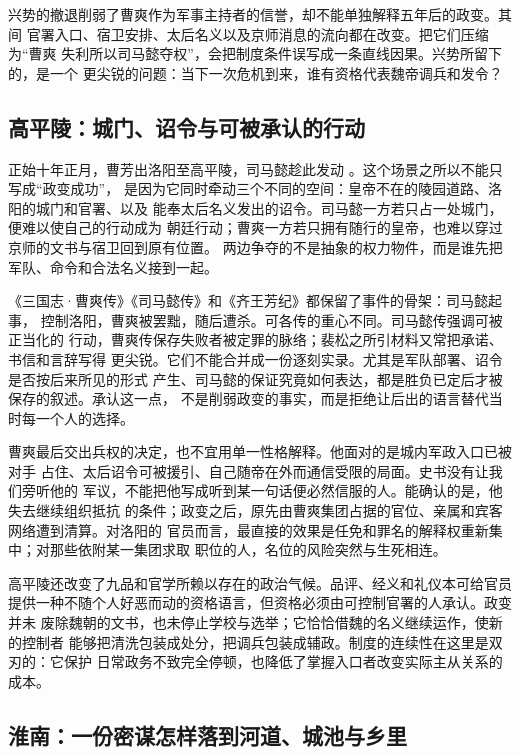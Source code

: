 \begin{turningpoint}
兴势的撤退削弱了曹爽作为军事主持者的信誉，却不能单独解释五年后的政变。其间
官署入口、宿卫安排、太后名义以及京师消息的流向都在改变。把它们压缩为“曹爽
失利所以司马懿夺权”，会把制度条件误写成一条直线因果。兴势所留下的，是一个
更尖锐的问题：当下一次危机到来，谁有资格代表魏帝调兵和发令？
\end{turningpoint}

\subsection{高平陵：城门、诏令与可被承认的行动}

正始十年正月，曹芳出洛阳至高平陵，司马懿趁此发动
。这个场景之所以不能只写成“政变成功”，
是因为它同时牵动三个不同的空间：皇帝不在的陵园道路、洛阳的城门和官署、以及
能奉太后名义发出的诏令。司马懿一方若只占一处城门，便难以使自己的行动成为
朝廷行动；曹爽一方若只拥有随行的皇帝，也难以穿过京师的文书与宿卫回到原有位置。
两边争夺的不是抽象的权力物件，而是谁先把军队、命令和合法名义接到一起。

《三国志·曹爽传》《司马懿传》和《齐王芳纪》都保留了事件的骨架：司马懿起事，
控制洛阳，曹爽被罢黜，随后遭杀。可各传的重心不同。司马懿传强调可被正当化的
行动，曹爽传保存失败者被定罪的脉络；裴松之所引材料又常把承诺、书信和言辞写得
更尖锐。它们不能合并成一份逐刻实录。尤其是军队部署、诏令是否按后来所见的形式
产生、司马懿的保证究竟如何表达，都是胜负已定后才被保存的叙述。承认这一点，
不是削弱政变的事实，而是拒绝让后出的语言替代当时每一个人的选择。

曹爽最后交出兵权的决定，也不宜用单一性格解释。他面对的是城内军政入口已被对手
占住、太后诏令可被援引、自己随帝在外而通信受限的局面。史书没有让我们旁听他的
军议，不能把他写成听到某一句话便必然信服的人。能确认的是，他失去继续组织抵抗
的条件；政变之后，原先由曹爽集团占据的官位、亲属和宾客网络遭到清算。对洛阳的
官员而言，最直接的效果是任免和罪名的解释权重新集中；对那些依附某一集团求取
职位的人，名位的风险突然与生死相连。

高平陵还改变了九品和官学所赖以存在的政治气候。品评、经义和礼仪本可给官员
提供一种不随个人好恶而动的资格语言，但资格必须由可控制官署的人承认。政变并未
废除魏朝的文书，也未停止学校与选举；它恰恰借魏的名义继续运作，使新的控制者
能够把清洗包装成处分，把调兵包装成辅政。制度的连续性在这里是双刃的：它保护
日常政务不致完全停顿，也降低了掌握入口者改变实际主从关系的成本。

\subsection{淮南：一份密谋怎样落到河道、城池与乡里}

